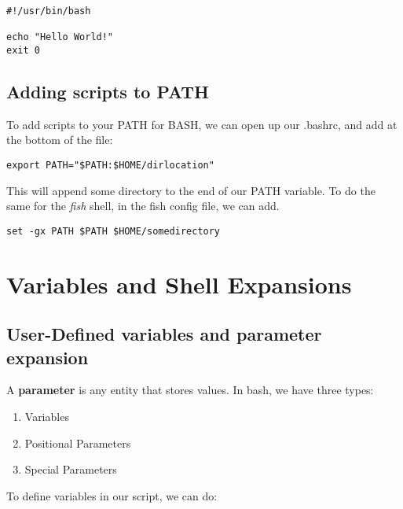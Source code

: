\documentclass{report}
\begin{document}
    \begin{verbatim}
#!/usr/bin/bash

echo "Hello World!"
exit 0
    \end{verbatim}
    \bigbreak \noindent 
    
    \bigbreak \noindent 

    \bigbreak \noindent 
    \subsection{Adding scripts to PATH}
    \bigbreak \noindent 
    To add scripts to your PATH for BASH, we can open up our .bashrc, and add at the bottom of the file:
    \bigbreak \noindent 
    
    \begin{verbatim}
export PATH="$PATH:$HOME/dirlocation"
    \end{verbatim}
    
    \bigbreak \noindent 
    This will append some directory to the end of our PATH variable. To do the same for the \textit{fish} shell, in the fish config file, we can add.
    \bigbreak \noindent 
    
    \begin{verbatim}
set -gx PATH $PATH $HOME/somedirectory
    \end{verbatim}
    

    \pagebreak \bigbreak \noindent 
    \section{\LARGE Variables and Shell Expansions}
    \bigbreak \noindent 
    \subsection{User-Defined variables and parameter expansion}
    \bigbreak \noindent 
    \smallbreak \noindent
    \begin{definition}
        A \textbf{parameter} is any entity that stores values. In bash, we have three types:
        \begin{enumerate}
            \item Variables
            \item Positional Parameters
            \item Special Parameters
        \end{enumerate}
    \end{definition}
    \bigbreak \noindent 
    To define variables in our script, we can do:
    
\end{document}
